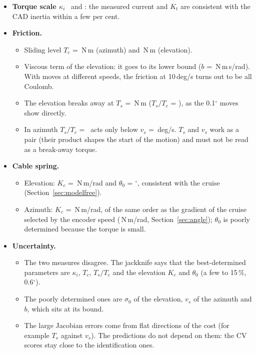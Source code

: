 \documentclass[10pt,a4paper]{article}
\numberwithin{equation}{section}
\begin{document}
\begin{itemize}
\item \textbf{Torque scale $\kappa_i$} \scaleAz\ and \scaleEl: the measured current and $K_t$ are consistent with the CAD inertia within a few per cent.
\item \textbf{Friction.}
  \begin{itemize}
  \item Sliding level $T_c$ = \TcAz\,N\,m (azimuth) and \TcEl\,N\,m (elevation).
  \item Viscous term of the elevation: it goes to its lower bound ($b$ = \bEl\,N\,m\,s/rad). With moves at different speeds, the friction at 10\,deg/s turns out to be all Coulomb.
  \item The elevation breaks away at $T_s$ = \TsEl\,N\,m ($T_s/T_c$ = \TsRatioEl), as the 0.1$^\circ$ moves show directly.
  \item In azimuth $T_s/T_c$ = \TsRatioAz\ acts only below $v_s$ = \vsDegAz\,deg/s. $T_s$ and $v_s$ work as a pair (their product shapes the start of the motion) and must not be read as a break-away torque.
  \end{itemize}
\item \textbf{Cable spring.}
  \begin{itemize}
  \item Elevation: $K_c$ = \KcEl\,N\,m/rad and $\theta_0$ = \thzEl$^\circ$, consistent with the cruise (Section~\ref{sec:modelfree}).
  \item Azimuth: $K_c$ = \KcAz\,N\,m/rad, of the same order as the gradient of the cruise selected by the encoder speed (\KencAz\,N\,m/rad, Section~\ref{sec:angle}); $\theta_0$ is poorly determined because the torque is small.
  \end{itemize}
\item \textbf{Uncertainty.}
  \begin{itemize}
  \item The two measures disagree. The jackknife says that the best-determined parameters are $\kappa_i$, $T_c$, $T_s/T_c$ and the elevation $K_c$ and $\theta_0$ (a few to 15\,\%, 0.6$^\circ$).
  \item The poorly determined ones are $\sigma_0$ of the elevation, $v_s$ of the azimuth and $b$, which sits at its bound.
  \item The large Jacobian errors come from flat directions of the cost (for example $T_s$ against $v_s$). The predictions do not depend on them: the CV scores stay close to the identification ones.
  \end{itemize}
\end{itemize}
\end{document}
